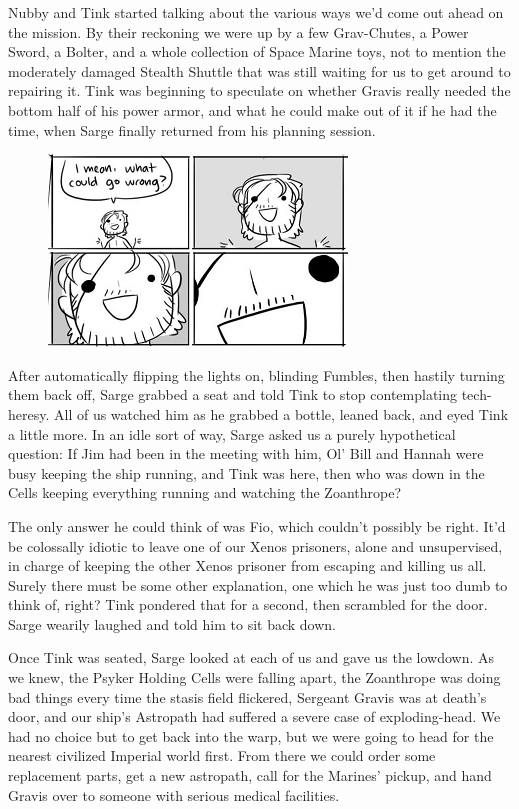 Nubby and Tink started talking about the various ways we'd come out ahead on the mission. 
By their reckoning we were up by a few Grav-Chutes, a Power Sword, a Bolter, and a whole collection of Space Marine toys, not to mention the moderately damaged Stealth Shuttle that was still waiting for us to get around to repairing it. 
Tink was beginning to speculate on whether Gravis really needed the bottom half of his power armor, and what he could make out of it if he had the time, when Sarge finally returned from his planning session.
\begin{figure}
	\begin{center}
		\includegraphics[width=\figwidth]{pics/12/80.png}
	\end{center}
\end{figure}
After automatically flipping the lights on, blinding Fumbles, then hastily turning them back off, Sarge grabbed a seat and told Tink to stop contemplating tech-heresy. 
All of us watched him as he grabbed a bottle, leaned back, and eyed Tink a little more. 
In an idle sort of way, Sarge asked us a purely hypothetical question: 
If Jim had been in the meeting with him, Ol' Bill and Hannah were busy keeping the ship running, and Tink was here, then who was down in the Cells keeping everything running and watching the Zoanthrope? 


The only answer he could think of was Fio, which couldn't possibly be right. 
It'd be colossally idiotic to leave one of our Xenos prisoners, alone and unsupervised, in charge of keeping the other Xenos prisoner from escaping and killing us all. 
Surely there must be some other explanation, one which he was just too dumb to think of, right? 
Tink pondered that for a second, then scrambled for the door. 
Sarge wearily laughed and told him to sit back down.

Once Tink was seated, Sarge looked at each of us and gave us the lowdown. 
As we knew, the Psyker Holding Cells were falling apart, the Zoanthrope was doing bad things every time the stasis field flickered, Sergeant Gravis was at death's door, and our ship's Astropath had suffered a severe case of exploding-head. 
We had no choice but to get back into the warp, but we were going to head for the nearest civilized Imperial world first. 
From there we could order some replacement parts, get a new astropath, call for the Marines' pickup, and hand Gravis over to someone with serious medical facilities. 


